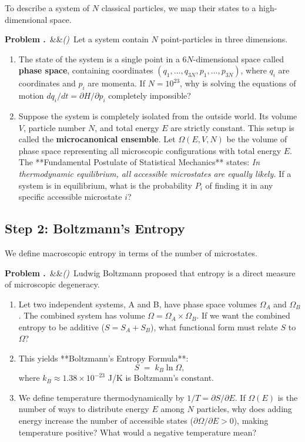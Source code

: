 \documentclass[12pt, a4paper, twoside]{book}
\newcounter{problem}[chapter]
\newcommand{\problem}[1][]{\refstepcounter{problem}\medskip\noindent
  \textcolor{accent}{\textbf{Problem \theproblem.}}\ \ifx&#1&\else\textit{(#1)}\ \fi}
\begin{document}
To describe a system of $N$ classical particles, we map their states to a high-dimensional space.

\begin{explobox}
\problem Let a system contain $N$ point-particles in three dimensions.
\begin{enumerate}[label=(\alph*), topsep=2pt]
  \item The state of the system is a single point in a $6N$-dimensional space called \textbf{phase space}, containing coordinates $(q_1, \dots, q_{3N}, p_1, \dots, p_{3N})$, where $q_i$ are coordinates and $p_i$ are momenta. If $N = 10^{23}$, why is solving the equations of motion $dq_i/dt = \partial H/\partial p_i$ completely impossible?
  \item Suppose the system is completely isolated from the outside world. Its volume $V$, particle number $N$, and total energy $E$ are strictly constant. This setup is called the \textbf{microcanonical ensemble}.
  Let $\Omega(E, V, N)$ be the volume of phase space representing all microscopic configurations with total energy $E$.
  The **Fundamental Postulate of Statistical Mechanics** states: \emph{In thermodynamic equilibrium, all accessible microstates are equally likely.}
  If a system is in equilibrium, what is the probability $P_i$ of finding it in any specific accessible microstate $i$?
\end{enumerate}
\end{explobox}

\subsection{Step 2: Boltzmann's Entropy}

We define macroscopic entropy in terms of the number of microstates.

\begin{explobox}
\problem Ludwig Boltzmann proposed that entropy is a direct measure of microscopic degeneracy.
\begin{enumerate}[label=(\alph*), topsep=2pt]
  \item Let two independent systems, A and B, have phase space volumes $\Omega_A$ and $\Omega_B$. The combined system has volume $\Omega = \Omega_A \times \Omega_B$. If we want the combined entropy to be additive ($S = S_A + S_B$), what functional form must relate $S$ to $\Omega$?
  \item This yields **Boltzmann's Entropy Formula**:
  \[
    S \;=\; k_B \ln \Omega,
  \]
  where $k_B \approx 1.38 \times 10^{-23}$ J/K is Boltzmann's constant.
  \item We define temperature thermodynamically by $1/T = \partial S/\partial E$. If $\Omega(E)$ is the number of ways to distribute energy $E$ among $N$ particles, why does adding energy increase the number of accessible states ($\partial \Omega/\partial E > 0$), making temperature positive? What would a negative temperature mean?
\end{enumerate}
\end{explobox}
\end{document}
